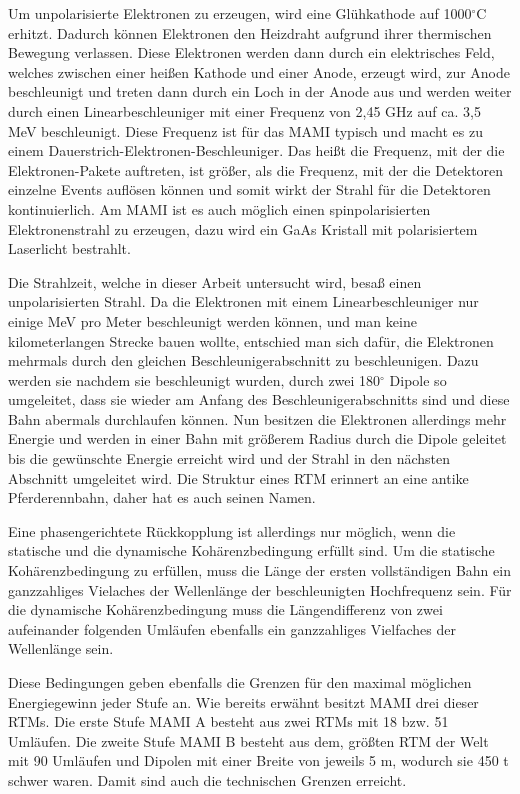 \documentclass[a4paper,11pt,oneside,final,german,openbib,pdftex]{scrbook}
\begin{document}
{Um unpolarisierte Elektronen zu erzeugen, wird eine Glühkathode auf 1000$^{\circ}$C erhitzt. Dadurch können Elektronen den Heizdraht aufgrund ihrer thermischen Bewegung verlassen. Diese Elektronen werden dann durch ein elektrisches Feld, welches zwischen einer heißen Kathode und einer Anode, erzeugt wird, zur Anode beschleunigt und treten dann durch ein Loch in der Anode aus und werden weiter durch einen Linearbeschleuniger mit einer Frequenz von 2,45 GHz auf ca. 3,5 MeV beschleunigt. Diese Frequenz ist für das MAMI typisch und macht es zu einem Dauerstrich-Elektronen-Beschleuniger. Das heißt die Frequenz, mit der die Elektronen-Pakete auftreten, ist größer, als die Frequenz, mit der die Detektoren einzelne Events auflösen können und somit wirkt der Strahl für die Detektoren kontinuierlich.
Am MAMI ist es auch m\"oglich einen spinpolarisierten Elektronenstrahl zu erzeugen, dazu wird ein GaAs Kristall mit polarisiertem Laserlicht bestrahlt. 

Die Strahlzeit, welche in dieser Arbeit untersucht wird, besa{\ss} einen unpolarisierten Strahl.
\newline
Da die Elektronen mit einem Linearbeschleuniger nur einige MeV pro Meter beschleunigt werden k\"onnen, und man keine kilometerlangen Strecke bauen wollte, entschied man sich daf\"ur, die Elektronen mehrmals durch den gleichen Beschleunigerabschnitt zu beschleunigen. Dazu werden sie nachdem sie beschleunigt wurden, durch zwei 180$^{\circ}$ Dipole so umgeleitet, dass sie wieder am Anfang des Beschleunigerabschnitts sind und diese Bahn abermals durchlaufen können. Nun besitzen die Elektronen allerdings mehr Energie und werden in einer Bahn mit gr\"o{\ss}erem Radius durch die Dipole geleitet bis die gew\"unschte Energie erreicht wird und der Strahl in den n\"achsten Abschnitt umgeleitet wird. Die Struktur eines RTM erinnert an eine antike Pferderennbahn, daher hat es auch seinen Namen.

 Eine phasengerichtete R\"uckkopplung ist allerdings nur m\"oglich, wenn die statische und die dynamische Koh\"arenzbedingung erf\"ullt sind. Um die statische Koh\"arenzbedingung zu erf\"ullen, muss die L\"ange der ersten vollst\"andigen Bahn ein ganzzahliges Vielaches der Wellenl\"ange der beschleunigten Hochfrequenz sein. F\"ur die dynamische Koh\"arenzbedingung muss die L\"angendifferenz von zwei aufeinander folgenden Uml\"aufen ebenfalls ein ganzzahliges Vielfaches der Wellenl\"ange sein\cite{Un08}. 
 
 Diese Bedingungen geben ebenfalls die Grenzen f\"ur den maximal m\"oglichen Energiegewinn jeder Stufe an. 
\newline
Wie bereits erw\"ahnt besitzt MAMI drei dieser RTMs. Die erste Stufe MAMI A besteht aus zwei RTMs mit 18 bzw. 51 Uml\"aufen. Die zweite Stufe MAMI B besteht aus dem, gr\"o{\ss}ten RTM der Welt mit 90 Uml\"aufen und Dipolen mit einer Breite von jeweils 5 m, wodurch sie 450 t schwer waren. Damit sind auch die technischen Grenzen erreicht.\cite{KPh11F}


}
\end{document}
